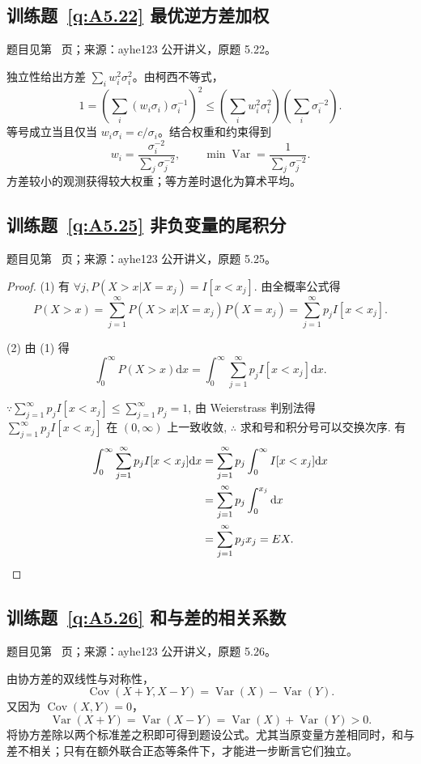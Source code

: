 \subsection*{训练题~\ref{q:A5.22} 最优逆方差加权}\label{a:A5.22}{\small 题目见第~\pageref{q:A5.22} 页；来源：ayhe123 公开讲义，原题 5.22。}
\begin{solve}独立性给出方差 $\sum_iw_i^2\sigma_i^2$。由柯西不等式，\[1=\left(\sum_i(w_i\sigma_i)\sigma_i^{-1}\right)^2\le\left(\sum_iw_i^2\sigma_i^2\right)\left(\sum_i\sigma_i^{-2}\right).\]等号成立当且仅当 $w_i\sigma_i=c/\sigma_i$。结合权重和约束得到\[w_i=\frac{\sigma_i^{-2}}{\sum_j\sigma_j^{-2}},\qquad\min\operatorname{Var}=\frac{1}{\sum_j\sigma_j^{-2}}.\]方差较小的观测获得较大权重；等方差时退化为算术平均。\end{solve}

\subsection*{训练题~\ref{q:A5.25} 非负变量的尾积分}\label{a:A5.25}{\small 题目见第~\pageref{q:A5.25} 页；来源：ayhe123 公开讲义，原题 5.25。}
\begin{proof}
    (1) 有 $\forall j,P(X>x|X=x_j)=I[x<x_j]$. 由全概率公式得
    \[P(X>x)=\sum\limits_{j=1}^\infty P(X>x|X=x_j)P(X=x_j)=\sum\limits_{j=1}^\infty p_jI[x<x_j].\]

    (2) 由 (1) 得
    \[\int_0^\infty P(X>x)\mathrm{d}x=\int_0^\infty\sum\limits_{j=1}^\infty p_jI[x<x_j]\mathrm{d}x.\]

    $\because\sum\limits_{j=1}^\infty p_jI[x<x_j]\leq\sum\limits_{j=1}^\infty p_j=1$, 由 Weierstrass 判别法得 $\sum\limits_{j=1}^\infty p_jI[x<x_j]$ 在 $(0,\infty)$ 上一致收敛, $\therefore$ 求和号和积分号可以交换次序. 有
    \begin{align*}
        \int_0^\infty\sum\limits_{j=1}^\infty p_jI[x<x_j]\mathrm{d}x & =\sum\limits_{j=1}^\infty p_j\int_0^\infty I[x<x_j]\mathrm{d}x \\
        & =\sum\limits_{j=1}^\infty p_j\int_0^{x_j}\mathrm{d}x \\
        & =\sum\limits_{j=1}^\infty p_jx_j=EX.\qedhere
    \end{align*}
\end{proof}

\subsection*{训练题~\ref{q:A5.26} 和与差的相关系数}\label{a:A5.26}{\small 题目见第~\pageref{q:A5.26} 页；来源：ayhe123 公开讲义，原题 5.26。}
\begin{solve}由协方差的双线性与对称性，\[\operatorname{Cov}(X+Y,X-Y)=\operatorname{Var}(X)-\operatorname{Var}(Y).\]又因为 $\operatorname{Cov}(X,Y)=0$，\[\operatorname{Var}(X+Y)=\operatorname{Var}(X-Y)=\operatorname{Var}(X)+\operatorname{Var}(Y)>0.\]将协方差除以两个标准差之积即可得到题设公式。尤其当原变量方差相同时，和与差不相关；只有在额外联合正态等条件下，才能进一步断言它们独立。\end{solve}

